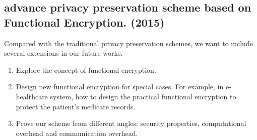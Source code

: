 \documentclass[letterpaper,12pt]{article}
\begin{document}
           \subsection{advance privacy preservation scheme based on Functional Encryption. (2015) }

           Compared with the traditional privacy preservation schemes, we want to include several extensions in our future works.
           \begin{enumerate}
               \item Explore the concept of functional encryption.
               \item Design new functional encryption for special cases. For example, in e-healthcare system, how to design the practical functional encryption to protect the patient's medicare records.
               \item Prove our scheme from different angles: security properties, computational overhead and communication overhead.
            \end{enumerate}

        \newpage
   
   
\end{document}
